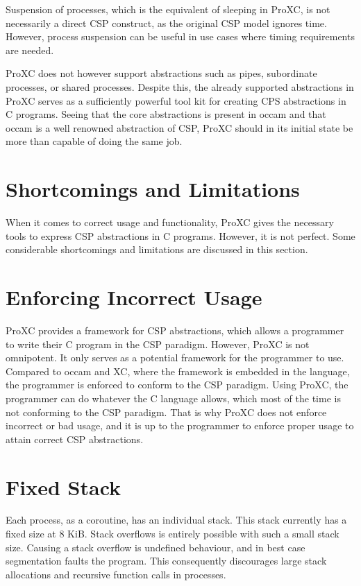 Suspension of processes, which is the equivalent of sleeping in ProXC, is not necessarily a direct CSP construct, as the original CSP model ignores time. However, process suspension can be useful in use cases where timing requirements are needed.

ProXC does not however support abstractions such as pipes, subordinate processes, or sha\-red processes. Despite this, the already supported abstractions in ProXC serves as a sufficiently powerful tool kit for creating CPS abstractions in C programs. Seeing that the core abstractions is present in occam and that occam is a well renowned abstraction of CSP, ProXC should in its initial state be more than capable of doing the same job. 

\section{Shortcomings and Limitations}

When it comes to correct usage and functionality, ProXC gives the necessary tools to express CSP abstractions in C programs. However, it is not perfect. Some considerable shortcomings and limitations are discussed in this section.

\section{Enforcing Incorrect Usage}

ProXC provides a framework for CSP abstractions, which allows a programmer to write their C program in the CSP paradigm. However, ProXC is not omnipotent. It only serves as a potential framework for the programmer to use. Compared to occam and XC, where the framework is embedded in the language, the programmer is enforced to conform to the CSP paradigm. Using ProXC, the programmer can do whatever the C language allows, which most of the time is not conforming to the CSP paradigm. That is why ProXC does not enforce incorrect or bad usage, and it is up to the programmer to enforce proper usage to attain correct CSP abstractions.

\section{Fixed Stack}
\label{sec:fixed_stack}

Each process, as a coroutine, has an individual stack. This stack currently has a fixed size at 8 KiB. Stack overflows is entirely possible with such a small stack size. Causing a stack overflow is undefined behaviour, and in best case segmentation faults the program. This consequently discourages large stack allocations and recursive function calls in processes.

